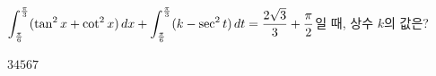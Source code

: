 $\displaystyle\int_{\frac{\pi}{6}}^{\frac{\pi}{3}}(\tan^2 x+\cot^2 x)\mkern3mu dx+\int_{\frac{\pi}{6}}^{\frac{\pi}{3}}(k-\sec^2 t)\mkern3mu dt=\dfrac{2\sqrt{3}}{3}+\dfrac{\pi}{2}$일 때, 상수 $k$의 값은?
\begin{choices32}{$3$}{$4$}{$5$}{$6$}{$7$}\end{choices32}
